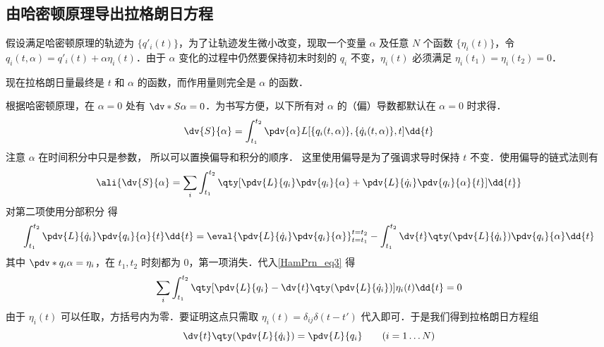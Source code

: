 \subsection{由哈密顿原理导出拉格朗日方程}

假设满足哈密顿原理的轨迹为 $\{q'_i(t)\}$，为了让轨迹发生微小改变，现取一个变量 $\alpha$ 及任意 $N$ 个函数 $\{\eta_i(t)\}$，令 $q_i(t,\alpha ) = q'_i(t) + \alpha \eta_i(t)$．由于 $\alpha$ 变化的过程中仍然要保持初末时刻的 $q_i$ 不变，$\eta_i(t)$ 必须满足 $\eta_i(t_1) = \eta_i(t_2) = 0$．

现在拉格朗日量最终是 $t$ 和 $\alpha$ 的函数，而作用量则完全是 $\alpha$ 的函数．
 
根据哈密顿原理，在 $\alpha = 0$ 处有 $\dv*{S}{\alpha} = 0$．为书写方便，以下所有对 $\alpha$ 的（偏）导数都默认在 $\alpha=0$ 时求得．
\begin{equation}
\dv{S}{\alpha} = \int_{t_1}^{t_2} \pdv{\alpha} L[\{q_i(t,\alpha )\}, \{\dot q_i(t,\alpha)\}, t] \dd{t}
\end{equation}
注意 $\alpha$ 在时间积分中只是参数， 所以可以置换偏导和积分的顺序． %
这里使用偏导是为了强调求导时保持 $t$ 不变．使用偏导的链式法则有
\begin{equation}\label{HamPrn_eq3}
\ali{
\dv{S}{\alpha} =
\sum_i \int_{t_1}^{t_2} \qty[\pdv{L}{q_i} \pdv{q_i}{\alpha} + \pdv{L}{\dot q_i}\pdv{q_i}{\alpha}{t}] \dd{t}
}\end{equation}
对第二项使用分部积分 得
\begin{equation}
\int_{t_1}^{t_2} \pdv{L}{\dot q_i} \pdv{q_i}{\alpha}{t} \dd{t}  = \eval{\pdv{L}{\dot q_i}\pdv{q_i}{\alpha}}_{t = t_1}^{t = t_2} - \int_{t_1}^{t_2} \dv{t} \qty(\pdv{L}{\dot q_i})\pdv{q_i}{\alpha} \dd{t}
\end{equation}
其中 $\pdv*{q_i}{\alpha}  = \eta_i$，在 $t_1, t_2$ 时刻都为 0，第一项消失．代入\autoref{HamPrn_eq3} 得
\begin{equation}
\sum_i \int_{t_1}^{t_2} \qty[\pdv{L}{q_i} - \dv{t} \qty(\pdv{L}{\dot q_i})] \eta_i(t) \dd{t} = 0
\end{equation}
由于 $\eta_i(t)$ 可以任取，方括号内为零．要证明这点只需取 $\eta_i(t) = \delta_{ij}\delta(t - t')$ 代入即可．于是我们得到拉格朗日方程组
\begin{equation}\label{HamPrn_eq2}
\dv{t} \qty(\pdv{L}{\dot q_i}) = \pdv{L}{q_i} \qquad
(i = 1\dots N)
\end{equation}
